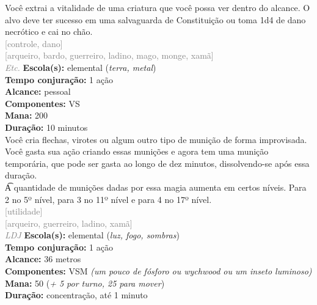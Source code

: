 \documentclass{RPG_Adventure}[2021/10/20]
\begin{document}
{\normalsize Você extrai a vitalidade de uma criatura que você possa ver dentro do alcance. O alvo deve ter sucesso em uma salvaguarda de Constituição ou toma 1d4 de dano necrótico e cai no chão.\\}
{\scriptsize \textcolor{gray}{[controle, dano]\\}}
{\scriptsize \textcolor{gray}{[arqueiro, bardo, guerreiro, ladino, mago, monge, xamã]\\}}
{\tiny \textcolor{gray}{\textit{Etc.}}}\jump{}
{\small \t \textbf{Escola(s):} elemental (\textit{terra, metal})\\\t \textbf{Tempo conjuração:} 1 ação\\\t \textbf{Alcance:} pessoal\\\t \textbf{Componentes:} VS\\\t \textbf{Mana:} 200\\\t \textbf{Duração:} 10 minutos\\}
{\normalsize Você cria flechas, virotes ou algum outro tipo de munição de forma improvisada. Você gasta sua ação criando essas munições e agora tem uma munição temporária, que pode ser gasta ao longo de dez minutos, dissolvendo-se após essa duração.\\\t A quantidade de munições dadas por essa magia aumenta em certos níveis. Para 2 no 5º nível, para 3 no 11º nível e para 4 no 17º nível.\\}
{\scriptsize \textcolor{gray}{[utilidade]\\}}
{\scriptsize \textcolor{gray}{[arqueiro, guerreiro, ladino, xamã]\\}}
{\tiny \textcolor{gray}{\textit{LDJ}}}\jump{}
{\small \t \textbf{Escola(s):} elemental (\textit{luz, fogo, sombras})\\\t \textbf{Tempo conjuração:} 1 ação\\\t \textbf{Alcance:} 36 metros\\\t \textbf{Componentes:} VSM \textit{(um pouco de fósforo ou wychwood ou um inseto luminoso)}\\\t \textbf{Mana:} 50 (\textit{+ 5 por turno, 25 para mover})\\\t \textbf{Duração:} concentração, até 1 minuto\\}
\end{document}
